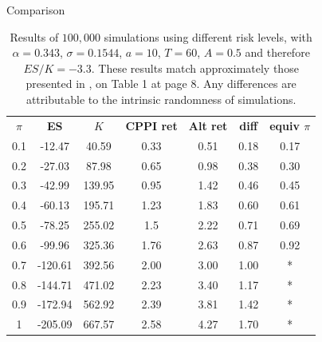 \documentclass[10pt]{beamer}
\begin{document}
\begin{frame}[fragile]{Comparison}
  \begin{table}[h]
    \centering
    \caption{Results of $100,000$ simulations using different risk levels, with $\alpha = 0.343$, $\sigma = 0.1544$, $a = 10$, $T = 60$, $A = 0.5$ and therefore $ES/K = -3.3$. These results match approximately those presented in \cite{a:guillen-optimisation}, on Table 1 at page 8. Any differences are attributable to the intrinsic randomness of simulations.}
    \label{tab:cppi_alt}
    \begin{tabular}{ccccccc}
    \textbf{$\pi$} & \textbf{ES } & \textbf{$K$} & \textbf{CPPI ret} & \textbf{Alt ret} & \textbf{diff}  & \textbf{equiv $\pi$}\\
    0.1   & -12.47  & 40.59  & 0.33     & 0.51    & 0.18    & 0.17\\
    0.2   & -27.03  & 87.98  & 0.65     & 0.98    & 0.38    & 0.30 \\
    0.3   & -42.99  & 139.95 & 0.95     & 1.42    & 0.46    & 0.45 \\
    0.4   & -60.13  & 195.71 & 1.23     & 1.83    & 0.60    & 0.61 \\
    0.5   & -78.25  & 255.02 & 1.5      & 2.22    & 0.71    & 0.69 \\
    0.6   & -99.96  & 325.36 & 1.76     & 2.63    & 0.87    & 0.92 \\
    0.7   & -120.61 & 392.56 & 2.00     & 3.00    & 1.00    & * \\
    0.8   & -144.71 & 471.02 & 2.23     & 3.40    & 1.17    & * \\
    0.9   & -172.94 & 562.92 & 2.39     & 3.81    & 1.42    & * \\
    1     & -205.09 & 667.57 & 2.58     & 4.27    & 1.70    & *
  \end{tabular}
\end{table}
\end{frame}
\end{document}
